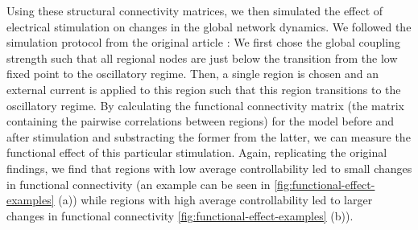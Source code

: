Using these structural connectivity matrices, we then simulated the effect of electrical stimulation on changes in the global network dynamics. We followed the 
simulation protocol from the original article \supercite{Muldoon2016}: We first chose the global coupling strength such that all regional nodes are just below the 
transition from the low fixed point to the oscillatory regime. Then, a single region is chosen and an external current is applied to this region such that this
region transitions to the oscillatory regime. By calculating the functional connectivity matrix (the matrix containing the pairwise correlations between regions) 
for the model before and after stimulation and substracting the former from the latter, we can measure the functional effect of this particular stimulation. Again, 
replicating the original findings, we find that regions with low average controllability led to small changes in functional connectivity (an example can be seen
in \ref{fig:functional-effect-examples} (a)) while regions with high average controllability led to larger changes in functional connectivity 
\ref{fig:functional-effect-examples} (b)).

